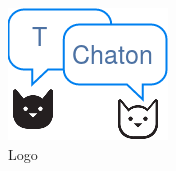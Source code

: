 \documentclass[12pt]{article}
\begin{document}
\begin{figure}[h]
    \centering
    \includegraphics[]{img/logo.png}
    \caption{Logo}
\end{figure}



\end{document}
